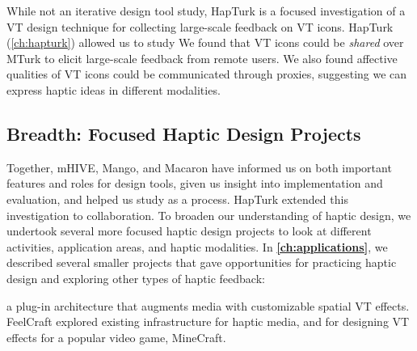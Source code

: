 	While not an iterative design tool study, HapTurk is a focused investigation of a VT design technique for collecting large-scale feedback on VT icons.
	HapTurk (\autoref{ch:hapturk}) allowed us to study 
	We found that VT icons could be \emph{shared} over MTurk to elicit large-scale feedback from remote users.
	We also found affective qualities of VT icons could be communicated through proxies, suggesting we can express haptic ideas in different modalities.


\subsection{Breadth: Focused Haptic Design Projects}
\label{ch:conclusion:approach:breadth}
Together, mHIVE, Mango, and Macaron have informed us on both important features and roles for design tools, given us insight into implementation and evaluation, and helped us study \haxd as a process.
HapTurk extended this investigation to collaboration.
To broaden our understanding of haptic design, we undertook several more focused haptic design projects to look at different activities, application areas, and haptic modalities.
In \textbf{\autoref{ch:applications}}, we described several smaller projects that gave opportunities for practicing haptic design and exploring other types of haptic feedback:

  a plug-in architecture that augments media with customizable spatial VT effects.
	FeelCraft explored existing infrastructure for haptic media, and for designing VT effects for a popular video game, MineCraft.
	
